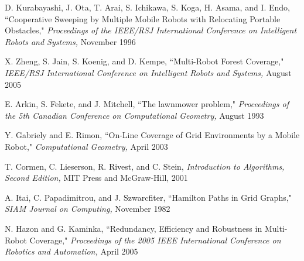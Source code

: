 \documentclass[letterpaper, 12pt, leqno]{report}
\begin{document}
\noindent [5] D. Kurabayashi, J. Ota, T. Arai, S. Ichikawa, S. Koga, H. Asama, and I. Endo, ``Cooperative Sweeping by Multiple Mobile Robots with Relocating Portable Obstacles," \textit{Proceedings of the IEEE/RSJ International Conference on Intelligent Robots and Systems,} November 1996

\noindent [6] X. Zheng, S. Jain, S. Koenig, and D. Kempe, ``Multi-Robot Forest Coverage," \textit{IEEE/RSJ International Conference on Intelligent Robots and Systems,} August 2005

\noindent [7] E. Arkin, S. Fekete, and J. Mitchell, ``The lawnmower problem," \textit{Proceedings of the 5th Canadian Conference on Computational Geometry,} August 1993

\noindent [8] Y. Gabriely and E. Rimon, ``On-Line Coverage of Grid Environments by a Mobile Robot," \textit{Computational Geometry,} April 2003

\noindent [9] T. Cormen, C. Lieserson, R. Rivest, and C. Stein, \textit{Introduction to Algorithms, Second Edition,} MIT Press and McGraw-Hill, 2001

\noindent [10] A. Itai, C. Papadimitrou, and J. Szwarcfiter, ``Hamilton Paths in Grid Graphs," \textit{SIAM Journal on Computing,}  November 1982

\noindent [11] N. Hazon and G. Kaminka, ``Redundancy, Efficiency and Robustness in Multi-Robot Coverage," \textit{Proceedings of the 2005 IEEE International Conference on Robotics and Automation,} April 2005



\end{document}
